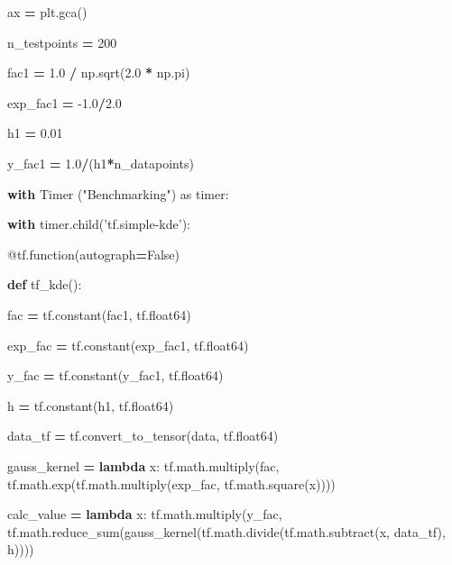 \documentclass[
  12pt,
  english,
  a4paper,
,tablecaptionabove
]{scrartcl}
\newenvironment{Shaded}{\begin{snugshade}}{\end{snugshade}}
\newcommand{\AttributeTok}[1]{\textcolor[rgb]{0.77,0.63,0.00}{#1}}
\newcommand{\ControlFlowTok}[1]{\textcolor[rgb]{0.13,0.29,0.53}{\textbf{#1}}}
\newcommand{\DecValTok}[1]{\textcolor[rgb]{0.00,0.00,0.81}{#1}}
\newcommand{\FloatTok}[1]{\textcolor[rgb]{0.00,0.00,0.81}{#1}}
\newcommand{\ImportTok}[1]{#1}
\newcommand{\KeywordTok}[1]{\textcolor[rgb]{0.13,0.29,0.53}{\textbf{#1}}}
\newcommand{\NormalTok}[1]{#1}
\newcommand{\OperatorTok}[1]{\textcolor[rgb]{0.81,0.36,0.00}{\textbf{#1}}}
\newcommand{\StringTok}[1]{\textcolor[rgb]{0.31,0.60,0.02}{#1}}
\newcommand{\VariableTok}[1]{\textcolor[rgb]{0.00,0.00,0.00}{#1}}
\begin{document}
\begin{Shaded}
\begin{Highlighting}[]


\NormalTok{ax }\OperatorTok{=}\NormalTok{ plt.gca()}



\NormalTok{n_testpoints }\OperatorTok{=} \DecValTok{200}

\NormalTok{fac1 }\OperatorTok{=} \FloatTok{1.0} \OperatorTok{/}\NormalTok{ np.sqrt(}\FloatTok{2.0} \OperatorTok{*}\NormalTok{ np.pi)}

\NormalTok{exp_fac1 }\OperatorTok{=} \FloatTok{-1.0}\OperatorTok{/}\FloatTok{2.0}

\NormalTok{h1 }\OperatorTok{=} \FloatTok{0.01}

\NormalTok{y_fac1 }\OperatorTok{=} \FloatTok{1.0}\OperatorTok{/}\NormalTok{(h1}\OperatorTok{*}\NormalTok{n_datapoints)}





\ControlFlowTok{with}\NormalTok{ Timer (}\StringTok{"Benchmarking"}\NormalTok{) }\ImportTok{as}\NormalTok{ timer:}

    \ControlFlowTok{with}\NormalTok{ timer.child(}\StringTok{'tf.simple-kde'}\NormalTok{):}

        \AttributeTok{@tf.function}\NormalTok{(autograph}\OperatorTok{=}\VariableTok{False}\NormalTok{)}

        \KeywordTok{def}\NormalTok{ tf_kde():}

\NormalTok{            fac }\OperatorTok{=}\NormalTok{ tf.constant(fac1, tf.float64)}

\NormalTok{            exp_fac }\OperatorTok{=}\NormalTok{ tf.constant(exp_fac1, tf.float64)}

\NormalTok{            y_fac }\OperatorTok{=}\NormalTok{ tf.constant(y_fac1, tf.float64)}

\NormalTok{            h }\OperatorTok{=}\NormalTok{ tf.constant(h1, tf.float64)}

\NormalTok{            data_tf }\OperatorTok{=}\NormalTok{ tf.convert_to_tensor(data, tf.float64)}

\NormalTok{            gauss_kernel }\OperatorTok{=} \KeywordTok{lambda}\NormalTok{ x: tf.math.multiply(fac, tf.math.exp(tf.math.multiply(exp_fac, tf.math.square(x))))}

\NormalTok{            calc_value }\OperatorTok{=} \KeywordTok{lambda}\NormalTok{ x: tf.math.multiply(y_fac, tf.math.reduce_sum(gauss_kernel(tf.math.divide(tf.math.subtract(x, data_tf), h))))}


\end{Highlighting}
\end{Shaded}
\end{document}
